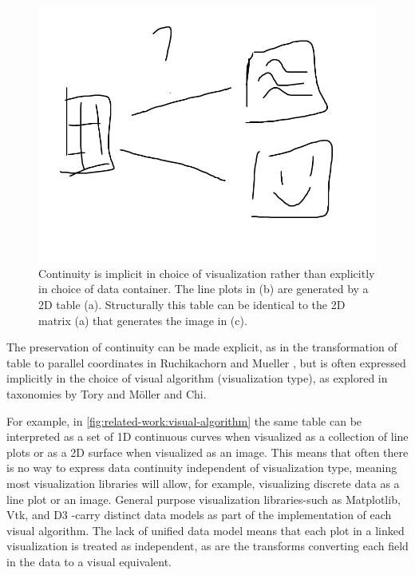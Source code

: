 \documentclass[10pt,journal,compsoc]{IEEEtran}
\theoremstyle{definition}
\theoremstyle{remark}
\begin{document}
\begin{figure}[h!]
  \includegraphics[width=\columnwidth]{whycontinuity.png}
  \caption{Continuity is implicit in choice of visualization rather than explicitly in choice of data container. The line plots in (b) are generated by a 2D table (a). Structurally this table can be identical to the 2D matrix (a) that generates the image in (c).}
  \label{fig:related-work:visual-algorithm}
\end{figure}

 The preservation of continuity can be made explicit, as in the transformation of table to parallel coordinates in Ruchikachorn and Mueller \cite{ruchikachornLearningVisualizationsAnalogy2015}, but is often expressed implicitly in the choice of visual algorithm (visualization type), as explored in taxonomies by Tory and M\"{o}ller \cite{toryRethinkingVisualizationHighlevel2004} and Chi\cite{chiTaxonomyVisualizationTechniques2000}.

For example, in \autoref{fig:related-work:visual-algorithm} the same table can be interpreted as a set of 1D continuous curves when visualized as a collection of line plots or as a 2D surface when visualized as an image.  This means that often there is no way to express data continuity independent of visualization type, meaning most visualization libraries will allow, for example, visualizing discrete data as a line plot or an image. General purpose visualization libraries-such as Matplotlib\cite{hunterMatplotlib2DGraphics2007}, Vtk\cite{hanwellVisualizationToolkitVTK2015,geveciVTK2012}, and D3 \cite{bostockDataDrivenDocuments2011}-carry distinct data models as part of the implementation of each visual algorithm. The lack of unified data model means that each plot in a linked\cite{beckerBrushingScatterplots1987,bujaInteractiveData1991} visualization is treated as independent, as are the transforms converting each field in the data to a visual equivalent.
\end{document}
